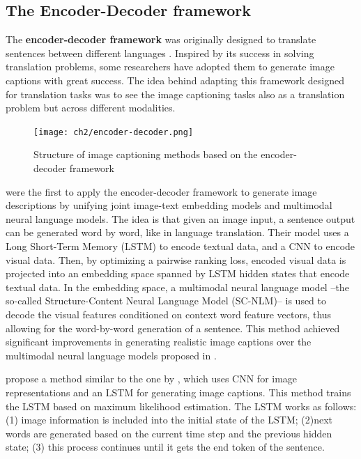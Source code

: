 \subsection{The Encoder-Decoder framework}\label{subsec:encoder-decoder_framework}

The \textbf{encoder-decoder framework} was originally designed to translate sentences between different languages \citep{Kalchbrenner2013, Sutskever2014, Cho2014}. Inspired by its success in solving translation problems, some researchers have adopted them to generate image captions with great success. The idea behind adapting this framework designed for translation tasks was to see the image captioning tasks also as a translation problem but across different modalities. 

\begin{figure}[hpt]
    \centering
    \texttt{[image: ch2/encoder-decoder.png]}
    \caption{Structure of image captioning methods based on the encoder-decoder framework}
    \label{fig:encoder-decoder_framework}
\end{figure}

\citet{Kiros2014_LBL} were the first to apply the encoder-decoder framework to generate image descriptions by unifying joint image-text embedding models and multimodal neural language models. The idea is that given an image input, a sentence output can be generated word by word, like in language translation. Their model uses a Long Short-Term Memory (LSTM) \citep{Hochreiter1997} to encode textual data, and a CNN to encode visual data. Then, by optimizing a pairwise ranking loss, encoded visual data is projected into an embedding space spanned by LSTM  hidden states that encode textual data. In the embedding space, a multimodal neural language model --the so-called Structure-Content Neural Language Model (SC-NLM)-- is used to decode the visual features conditioned on context word feature vectors, thus allowing for the word-by-word generation of a sentence. This method achieved significant improvements in generating realistic image captions over the multimodal neural language models proposed in \citep{Kiros2014_VS}.

\citet{Vinyals2015} propose a method similar to the one by \citet{Kiros2014_VS}, which uses CNN for image representations and an LSTM for generating image captions. This method trains the LSTM based on maximum likelihood estimation. The LSTM works as follows: (1) image information is included into the initial state of the LSTM; (2)next words are generated based on the current time step and the previous hidden state; (3) this process continues until it gets the end token of the sentence. 

